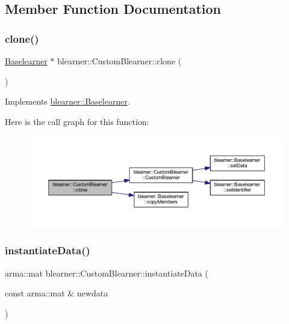 \subsection{Member Function Documentation}
\mbox{\label{classblearner_1_1_custom_blearner_a7ceeee2b7fffd11f376018bc1d3cfba1}} 
\subsubsection{\texorpdfstring{clone()}{clone()}}
{\footnotesize\ttfamily \mbox{\hyperlink{classblearner_1_1_baselearner}{Baselearner}} $\ast$ blearner\+::\+Custom\+Blearner\+::clone (\begin{DoxyParamCaption}{ }\end{DoxyParamCaption})\hspace{0.3cm}{\ttfamily [virtual]}}



Implements \mbox{\hyperlink{classblearner_1_1_baselearner_a8e12c6739f085917a7d2da6570c51a21}{blearner\+::\+Baselearner}}.

Here is the call graph for this function\+:\nopagebreak
\begin{figure}[H]
\begin{center}
\leavevmode
\includegraphics[width=350pt]{classblearner_1_1_custom_blearner_a7ceeee2b7fffd11f376018bc1d3cfba1_cgraph}
\end{center}
\end{figure}
\mbox{\label{classblearner_1_1_custom_blearner_a18971368219f6948456b8e60c20b6968}} 
\subsubsection{\texorpdfstring{instantiate\+Data()}{instantiateData()}}
{\footnotesize\ttfamily arma\+::mat blearner\+::\+Custom\+Blearner\+::instantiate\+Data (\begin{DoxyParamCaption}\item[{const arma\+::mat \&}]{newdata }\end{DoxyParamCaption})\hspace{0.3cm}{\ttfamily [virtual]}}



